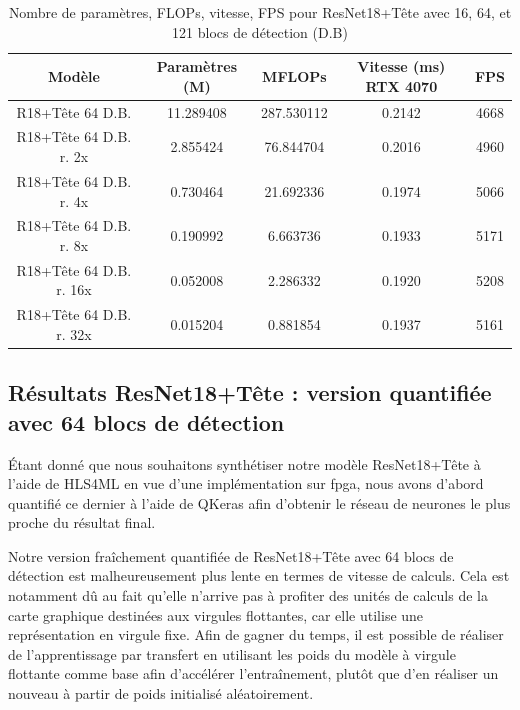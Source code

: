 \begin{table}[!ht]
    \caption{Nombre de paramètres, FLOPs, vitesse, FPS pour ResNet18+Tête avec 16, 64, et 121 blocs de détection (D.B)}
    \label{tab:resnet18+head_params_flops_vitesse_fps_reduced}
    \centering
    \begin{tabular}{ |c||c|c|c|c| }
        \hline
        \rowcolor{gray!50}
        Modèle & Paramètres (M) & MFLOPs & Vitesse (ms) RTX 4070 & FPS\\
        \hline
        R18+Tête 64 D.B. & 11.289408 & 287.530112 & 0.2142 & 4668\\
        R18+Tête 64 D.B. r. 2x & 2.855424 & 76.844704 & 0.2016 & 4960\\
        R18+Tête 64 D.B. r. 4x & 0.730464 & 21.692336 & 0.1974 & 5066\\
        R18+Tête 64 D.B. r. 8x & 0.190992 & 6.663736 & 0.1933 & 5171\\
        R18+Tête 64 D.B. r. 16x & 0.052008 & 2.286332 & 0.1920 & 5208\\
        R18+Tête 64 D.B. r. 32x & 0.015204 & 0.881854 & 0.1937 & 5161\\
        \hline
    \end{tabular}
\end{table}

\break

\subsection{Résultats ResNet18+Tête : version quantifiée avec 64 blocs de détection}

Étant donné que nous souhaitons synthétiser notre modèle ResNet18+Tête à l'aide de HLS4ML en vue d'une implémentation sur \acrshort{fpga}, nous avons d'abord quantifié ce dernier à l'aide de QKeras afin d'obtenir le réseau de neurones le plus proche du résultat final.

Notre version fraîchement quantifiée de ResNet18+Tête avec 64 blocs de détection est malheureusement plus lente en termes de vitesse de calculs. Cela est notamment dû au fait qu'elle n'arrive pas à profiter des unités de calculs de la carte graphique destinées aux virgules flottantes, car elle utilise une représentation en virgule fixe. Afin de gagner du temps, il est possible de réaliser de l'apprentissage par transfert en utilisant les poids du modèle à virgule flottante comme base afin d'accélérer l'entraînement, plutôt que d'en réaliser un nouveau à partir de poids initialisé aléatoirement.\\


